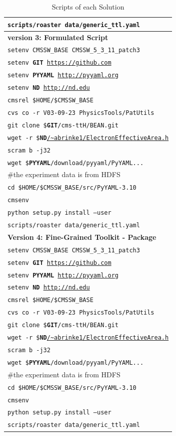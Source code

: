 \documentclass[procedia]{easychair}
\begin{document}
\begin{table}
\begin{tabular}{|l|}
        {\tt scripts/roaster data/generic\_ttl.yaml} \\ 
        \hline
        {\bf version 3: Formulated Script} \\ \hline
        {\tt setenv CMSSW\_BASE CMSSW\_5\_3\_11\_patch3} \\
        {\tt setenv {\bf GIT} \url{https://github.com}} \\
        {\tt setenv {\bf PYYAML} \url{http://pyyaml.org}} \\
        {\tt setenv {\bf ND} \url{http://nd.edu}} \\
        {\tt cmsrel \$HOME/\$CMSSW\_BASE} \\
        {\tt cvs co -r V03-09-23 PhysicsTools/PatUtils} \\
        {\tt git clone \${\bf GIT}/cms-ttH/BEAN.git} \\
        {\tt wget -r \${\bf ND}\url{/~abrinke1/ElectronEffectiveArea.h}} \\
        {\tt scram b -j32} \\
        {\tt wget \${\bf PYYAML}/download/pyyaml/PyYAML...}\\
        \#the experiment data is from HDFS \\
        {\tt cd \$HOME/\$CMSSW\_BASE/src/PyYAML-3.10}\\
        {\tt cmsenv}\\
        {\tt python setup.py install --user} \\
        {\tt scripts/roaster data/generic\_ttl.yaml} \\ 
        \hline
       {\bf Version 4: Fine-Grained Toolkit - Package}\\ \hline
        {\tt setenv CMSSW\_BASE CMSSW\_5\_3\_11\_patch3} \\
        {\tt setenv {\bf GIT} \url{https://github.com}} \\
        {\tt setenv {\bf PYYAML} \url{http://pyyaml.org}} \\
        {\tt setenv {\bf ND} \url{http://nd.edu}} \\
        {\tt cmsrel \$HOME/\$CMSSW\_BASE} \\
        {\tt cvs co -r V03-09-23 PhysicsTools/PatUtils} \\
        {\tt git clone \${\bf GIT}/cms-ttH/BEAN.git} \\
        {\tt wget -r \${\bf ND}\url{/~abrinke1/ElectronEffectiveArea.h}} \\
        {\tt scram b -j32} \\
        {\tt wget \${\bf PYYAML}/download/pyyaml/PyYAML...}\\
        \#the experiment data is from HDFS \\
        {\tt cd \$HOME/\$CMSSW\_BASE/src/PyYAML-3.10}\\
        {\tt cmsenv}\\
        {\tt python setup.py install --user} \\
        {\tt scripts/roaster data/generic\_ttl.yaml} \\ 
        \hline
    \end{tabular}
    \caption{Scripts of each Solution}
    \label{table:scripts}
\end{table}
\end{document}
